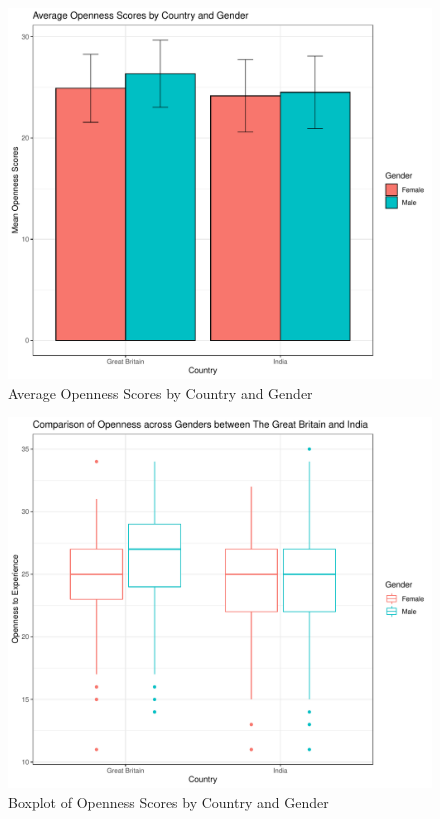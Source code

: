 \documentclass[
  english,
  man, fleqn, noextraspace]{apa6}
\begin{document}
\begin{figure}
\centering
\includegraphics{final_project_files/figure-latex/barplot-1.pdf}
\caption{\label{fig:barplot}Average Openness Scores by Country and Gender}
\end{figure}

\begin{figure}
\centering
\includegraphics{final_project_files/figure-latex/boxplot-1.pdf}
\caption{\label{fig:boxplot}Boxplot of Openness Scores by Country and Gender}
\end{figure}
\end{document}
